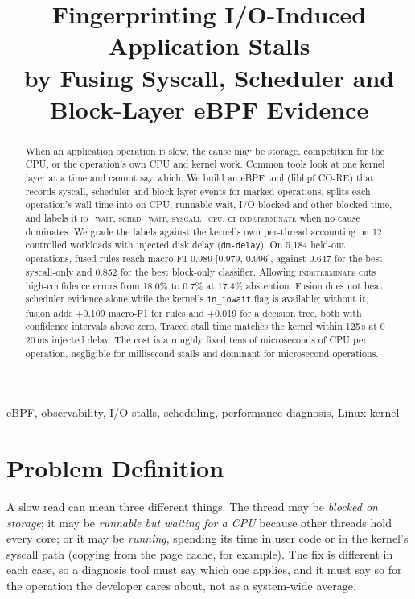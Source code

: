 \documentclass[conference]{IEEEtran}
\newcommand{\lbl}[1]{\textsc{#1}}
\newcommand{\IO}{\lbl{io\_wait}}
\newcommand{\SCHED}{\lbl{sched\_wait}}
\newcommand{\CPU}{\lbl{syscall\_cpu}}
\newcommand{\IND}{\lbl{indeterminate}}
\begin{document}
\title{Fingerprinting I/O-Induced Application Stalls\\ by Fusing Syscall, Scheduler and Block-Layer eBPF Evidence}

\author{
}

\maketitle

\begin{abstract}
When an application operation is slow, the cause may be storage, competition for the CPU, or the operation's own CPU and kernel work. Common tools look at one kernel layer at a time and cannot say which. We build an eBPF tool (libbpf CO-RE) that records syscall, scheduler and block-layer events for marked operations, splits each operation's wall time into on-CPU, runnable-wait, I/O-blocked and other-blocked time, and labels it \IO, \SCHED, \CPU, or \IND{} when no cause dominates. We grade the labels against the kernel's own per-thread accounting on 12 controlled workloads with injected disk delay (\texttt{dm-delay}). On 5,184 held-out operations, fused rules reach macro-F1 0.989 [0.979, 0.996], against 0.647 for the best syscall-only and 0.852 for the best block-only classifier. Allowing \IND{} cuts high-confidence errors from 18.0\% to 0.7\% at 17.4\% abstention. Fusion does not beat scheduler evidence alone while the kernel's \texttt{in\_iowait} flag is available; without it, fusion adds +0.109 macro-F1 for rules and +0.019 for a decision tree, both with confidence intervals above zero. Traced stall time matches the kernel within 125\,\textmu s at 0--20\,ms injected delay. The cost is a roughly fixed tens of microseconds of CPU per operation, negligible for millisecond stalls and dominant for microsecond operations.
\end{abstract}

\begin{IEEEkeywords}
eBPF, observability, I/O stalls, scheduling, performance diagnosis, Linux kernel
\end{IEEEkeywords}

\section{Problem Definition}
A slow read can mean three different things. The thread may be \emph{blocked on storage}; it may be \emph{runnable but waiting for a CPU} because other threads hold every core; or it may be \emph{running}, spending its time in user code or in the kernel's syscall path (copying from the page cache, for example). The fix is different in each case, so a diagnosis tool must say which one applies, and it must say so for the operation the developer cares about, not as a system-wide average.
\end{document}
